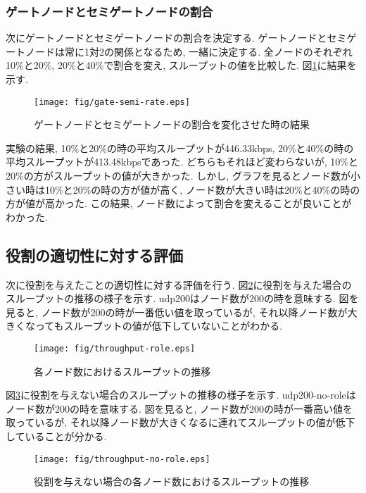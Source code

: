 \subsubsection{ゲートノードとセミゲートノードの割合}
次にゲートノードとセミゲートノードの割合を決定する. ゲートノードとセミゲートノードは常に1対2の関係となるため, 一緒に決定する. 全ノードのそれぞれ10\%と20\%, 20\%と40\%で割合を変え, スループットの値を比較した. 図\ref{fig:gate-semi-rate}に結果を示す.

\begin{figure}[h]
  \centering
  \texttt{[image: fig/gate-semi-rate.eps]}
  \caption{ゲートノードとセミゲートノードの割合を変化させた時の結果}
  \label{fig:gate-semi-rate}
\end{figure}

実験の結果, 10\%と20\%の時の平均スループットが446.33kbps, 20\%と40\%の時の平均スループットが413.48kbpsであった. どちらもそれほど変わらないが, 10\%と20\%の方がスループットの値が大きかった. しかし, グラフを見るとノード数が小さい時は10\%と20\%の時の方が値が高く, ノード数が大きい時は20\%と40\%の時の方が値が高かった. この結果, ノード数によって割合を変えることが良いことがわかった.

\subsection{役割の適切性に対する評価}
次に役割を与えたことの適切性に対する評価を行う. 図\ref{fig:throughput-role}に役割を与えた場合のスループットの推移の様子を示す. udp200はノード数が200の時を意味する. 図を見ると, ノード数が200の時が一番低い値を取っているが, それ以降ノード数が大きくなってもスループットの値が低下していないことがわかる.

\begin{figure}[h]
  \centering
  \texttt{[image: fig/throughput-role.eps]}
  \caption{各ノード数におけるスループットの推移}
  \label{fig:throughput-role}
\end{figure}

\newpage

図\ref{fig:throughput-no-role}に役割を与えない場合のスループットの推移の様子を示す. udp200-no-roleはノード数が200の時を意味する. 図を見ると, ノード数が200の時が一番高い値を取っているが, それ以降ノード数が大きくなるに連れてスループットの値が低下していることが分かる.

\begin{figure}[h]
  \centering
  \texttt{[image: fig/throughput-no-role.eps]}
  \caption{役割を与えない場合の各ノード数におけるスループットの推移}
  \label{fig:throughput-no-role}
\end{figure}

